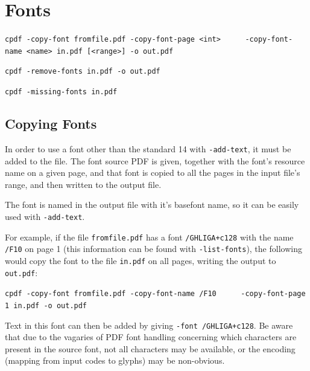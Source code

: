 \documentclass[a4paper,makeidx]{memoir}
\begin{document}

\chapter{Fonts}
  \begin{framed}
  \noindent\verb!cpdf -copy-font fromfile.pdf -copy-font-page <int>!
  \noindent\verb!     -copy-font-name <name> in.pdf [<range>] -o out.pdf!

  \vspace{1.5mm}
  \noindent\verb!cpdf -remove-fonts in.pdf -o out.pdf!

  \vspace{1.5mm}
  \noindent\verb!cpdf -missing-fonts in.pdf!
  \end{framed} 
\section{Copying Fonts}
\label{copyfont}

In order to use a font other than the standard 14 with \verb!-add-text!, it
must be added to the file. The font source PDF is given, together with the
font's resource name on a given page, and that font is copied to all the pages
in the input file's range, and then written to the output file.

The font is named in the output file with it's basefont name, so it can be
easily used with \verb!-add-text!.

For example, if the file \verb!fromfile.pdf! has a font \verb!/GHLIGA+c128! with
the name \verb!/F10! on page 1 (this information can be found with
\verb!-list-fonts!), the following would copy the font to the file
\verb!in.pdf! on all pages, writing the output to \verb!out.pdf!:
  \begin{framed}
  \small\noindent\verb!cpdf -copy-font fromfile.pdf -copy-font-name /F10!
  \small\noindent\verb!     -copy-font-page 1 in.pdf -o out.pdf!
  \vspace{2.5mm}
  \end{framed}

\noindent Text in this font can then be added by giving \verb!-font /GHLIGA+c128!. Be
aware that due to the vagaries of PDF font handling concerning which characters
are present in the source font, not all characters may be available, or the
encoding (mapping from input codes to glyphs) may be non-obvious.
\end{document}
